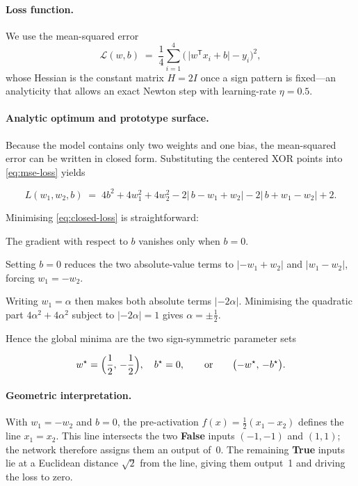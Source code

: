 \paragraph{Loss function.}
We use the mean-squared error
\begin{equation}
    \mathcal{L}(w,b)
    \;=\;
    \frac{1}{4} \sum_{i=1}^{4} 
    \bigl(\,\lvert w^{\mathsf T}x_i + b\rvert - y_i\bigr)^2,
    \label{eq:mse-loss}
\end{equation}
whose Hessian is the constant matrix \(H = 2I\) once a sign pattern is
fixed—an analyticity that allows an exact Newton step with learning-rate
\(\eta = 0.5\).

\paragraph{Analytic optimum and prototype surface.}
Because the model contains only two weights and one bias, the mean-squared
error can be written in closed form.  Substituting the centered XOR points into
\eqref{eq:mse-loss} yields

\[
  L(w_1,w_2,b)\;=\;
  4b^2 + 4w_1^2 + 4w_2^2
  - 2\bigl|\,b-w_1+w_2\bigr|
  - 2\bigl|\,b+w_1-w_2\bigr| + 2.
  \tag{1}\label{eq:closed-loss}
\]

Minimising \eqref{eq:closed-loss} is straightforward:

\begin{enumerate*}[label=(\roman*)]
  \item The gradient with respect to \(b\) vanishes only when
        \(b = 0\).
  \item Setting \(b=0\) reduces the two absolute-value terms to
        \(\lvert -w_1+w_2\rvert\) and \(\lvert w_1-w_2\rvert\),
        forcing \(w_1 = -w_2\).
  \item Writing \(w_1 = \alpha\) then makes both absolute terms
        \(\lvert -2\alpha\rvert\).  Minimising the quadratic part
        \(4\alpha^2 + 4\alpha^2\) subject to
        \(\lvert -2\alpha\rvert = 1\) gives \(\alpha = \pm\tfrac12\).
\end{enumerate*}

Hence the global minima are the two sign-symmetric parameter sets

\[
  w^\star = \Bigl(\frac12,\,-\frac12\Bigr),\quad b^\star = 0,
  \qquad\text{or}\qquad
  \bigl(-w^\star,\,-b^\star\bigr).
\]

\paragraph{Geometric interpretation.}
With \(w_1=-w_2\) and \(b=0\), the pre-activation
\(f(x)=\tfrac12(x_1-x_2)\) defines the line \(x_1=x_2\).
This line intersects the two \textbf{False} inputs
\(({-}1,{-}1)\) and \((1,1)\); the network therefore assigns them an output
of~0.  
The remaining \textbf{True} inputs lie at a Euclidean distance
\(\sqrt2\) from the line, giving them output~1 and driving the loss to zero.

